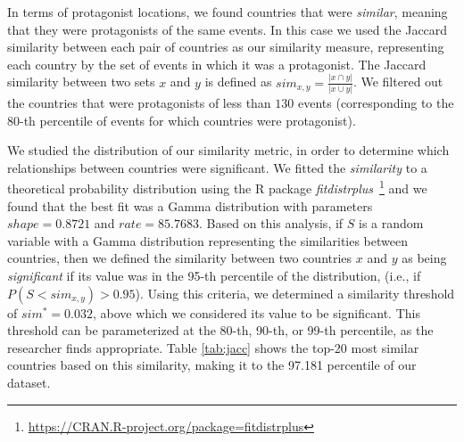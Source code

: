 In terms of protagonist locations, we found countries that were {\em similar},
meaning that they were protagonists of the same events. In this case we used
the Jaccard similarity between each
pair of countries as our similarity measure, representing each country by the set of
events in which it was a protagonist.  The Jaccard similarity between
two sets $x$ and $y$ is defined as $sim_{x, y} = \frac{|x \cap
y|}{|x \cup y|}$.  We filtered out the countries that were
protagonists of less than $130$ events (corresponding to the 80-th
percentile of events for which countries were protagonist).

%
%
We studied the distribution of our similarity metric, in order to determine which relationships
between countries were significant. We
fitted the \emph{similarity} to a theoretical probability distribution using the R package {\em
fitdistrplus}~\footnote{\url{https://CRAN.R-project.org/package=fitdistrplus}}
and we found that the best fit was a Gamma distribution with parameters
$shape=0.8721$ and $rate=85.7683$.  Based on this analysis, if $S$ is a
random variable with a Gamma distribution representing the similarities
between countries, then we defined the similarity between two countries $x$ and $y$
as being {\em significant} if its value was in the 95-th percentile of the distribution,
(i.e., if $P( S < sim_{x,y} ) > 0.95$).  Using this criteria, we determined a similarity 
threshold of $sim^*=0.032$, above which we considered its value to be significant.  
This threshold can be parameterized at the 80-th, 90-th, or 99-th percentile, 
as the researcher finds appropriate.  Table \ref{tab:jacc} shows the top-20 most similar
countries based on this similarity, making it to the 97.181 percentile of
our dataset.



